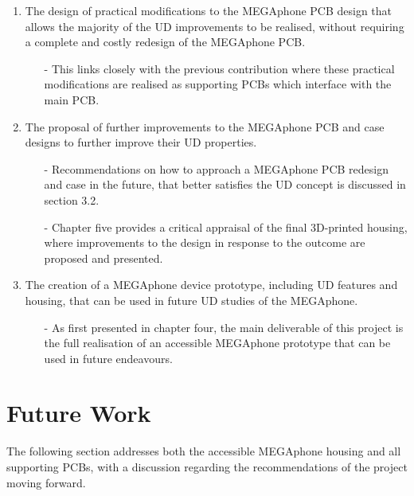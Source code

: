\begin{enumerate}
\begin{enumerate}
        \end{enumerate} 
    \item The design of practical modifications to the MEGAphone PCB design that allows the majority of the UD improvements to be realised, without requiring a complete and costly redesign of the MEGAphone PCB.
        \begin{enumerate}
        \item[-] This links closely with the previous contribution where these practical modifications are realised as supporting PCBs which interface with the main PCB.
        \end{enumerate} 
    \item The proposal of further improvements to the MEGAphone PCB and case designs to further improve their UD properties.
        \begin{enumerate}
        \item[-] Recommendations on how to approach a MEGAphone PCB redesign and case in the future, that better satisfies the UD concept is discussed in section 3.2.
        \item[-] Chapter five provides a critical appraisal of the final 3D-printed housing, where improvements to the design in response to the outcome are proposed and presented.
        \end{enumerate} 
    \item The creation of a MEGAphone device prototype, including UD features and housing, that can be used in future UD studies of the MEGAphone.
        \begin{enumerate}
        \item[-] As first presented in chapter four, the main deliverable of this project is the full realisation of an accessible MEGAphone prototype that can be used in future endeavours.
        \end{enumerate} 
\end{enumerate}

\section{Future Work}
The following section addresses both the accessible MEGAphone housing and all supporting PCBs, with a discussion regarding the recommendations of the project moving forward.

